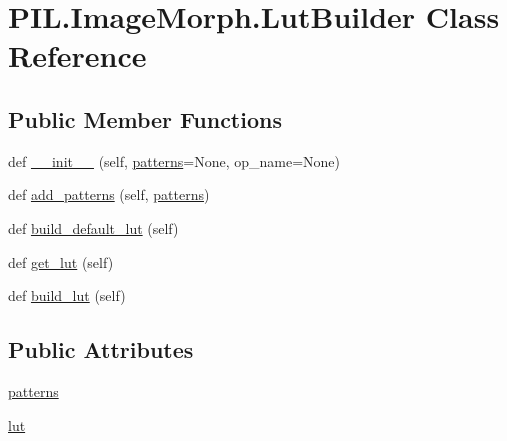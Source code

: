 \hypertarget{classPIL_1_1ImageMorph_1_1LutBuilder}{}\section{P\+I\+L.\+Image\+Morph.\+Lut\+Builder Class Reference}
\label{classPIL_1_1ImageMorph_1_1LutBuilder}
\subsection*{Public Member Functions}
\begin{DoxyCompactItemize}
\item 
def \hyperlink{classPIL_1_1ImageMorph_1_1LutBuilder_a98a5667d375bddc23ab5996f5d39efd5}{\+\_\+\+\_\+init\+\_\+\+\_\+} (self, \hyperlink{classPIL_1_1ImageMorph_1_1LutBuilder_ab697ff5a1f2743a25ed4b3c1543eecd6}{patterns}=None, op\+\_\+name=None)
\item 
def \hyperlink{classPIL_1_1ImageMorph_1_1LutBuilder_a2cf47074688ae377ec9618bc21ef7629}{add\+\_\+patterns} (self, \hyperlink{classPIL_1_1ImageMorph_1_1LutBuilder_ab697ff5a1f2743a25ed4b3c1543eecd6}{patterns})
\item 
def \hyperlink{classPIL_1_1ImageMorph_1_1LutBuilder_a1d4d66ed0a62c745a5c577b1546e6bba}{build\+\_\+default\+\_\+lut} (self)
\item 
def \hyperlink{classPIL_1_1ImageMorph_1_1LutBuilder_af02c47d0f7d9f078d5fc6fc58a1edf9e}{get\+\_\+lut} (self)
\item 
def \hyperlink{classPIL_1_1ImageMorph_1_1LutBuilder_a6405189ec8c306c5098865156c30c4b1}{build\+\_\+lut} (self)
\end{DoxyCompactItemize}
\subsection*{Public Attributes}
\begin{DoxyCompactItemize}
\item 
\hyperlink{classPIL_1_1ImageMorph_1_1LutBuilder_ab697ff5a1f2743a25ed4b3c1543eecd6}{patterns}
\item 
\hyperlink{classPIL_1_1ImageMorph_1_1LutBuilder_a0aa58dbb19268151aed0479be9e2365d}{lut}
\end{DoxyCompactItemize}



